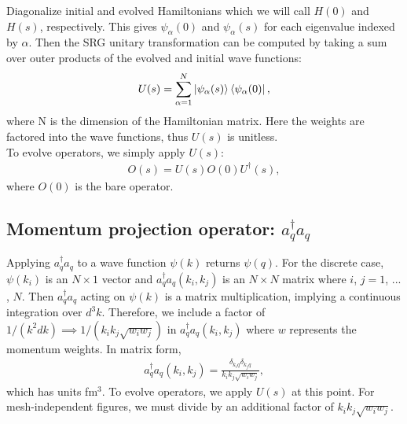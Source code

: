 \documentclass[preprintnumbers,floatfix,aps,prc,preprint,nofootinbib]{revtex4-1}
\begin{document}
Diagonalize initial and evolved Hamiltonians which we will call $H(0)$ and $H(s)$, respectively. This gives $\psi_{\alpha}(0)$ and $\psi_{\alpha}(s)$ for each eigenvalue indexed by $\alpha$. Then the SRG unitary transformation can be computed by taking a sum over outer products of the evolved and initial wave functions:
%
\begin{eqnarray}
	\label{eq:unitary_transformation}
	U(s) = \sum_{\alpha=1}^{N} \ket{\psi_{\alpha}(s)} \bra{\psi_{\alpha}(0)},
\end{eqnarray}
%
where N is the dimension of the Hamiltonian matrix. Here the weights are factored into the wave functions, thus $U(s)$ is unitless.
\\

To evolve operators, we simply apply $U(s)$:
%
\begin{eqnarray}
	\label{eq:evolved_operator}
	O(s) = U(s) O(0) U^{\dagger}(s),
\end{eqnarray}
%
where $O(0)$ is the bare operator.


\subsection{Momentum projection operator: $a^{\dagger}_q a_q$}
\label{sec:momentum_proj_operator}


Applying $a^{\dagger}_q a_q$ to a wave function $\psi(k)$ returns $\psi(q)$. For the discrete case, $\psi(k_i)$ is an $N \times 1$ vector and $a^{\dagger}_q a_q (k_i, k_j)$ is an $N \times N$ matrix where $i$, $j=1$, ... , $N$. Then $a^{\dagger}_q a_q$ acting on $\psi(k)$ is a matrix multiplication, implying a continuous integration over $d^3k$. Therefore, we include a factor of $1 / (k^2 dk) \implies 1 / (k_i k_j \sqrt{w_i w_j})$ in $a^{\dagger}_q a_q (k_i, k_j)$ where $w$ represents the momentum weights. In matrix form,
%
\begin{eqnarray}
	\label{eq:momentum_projection_operator}
	a^{\dagger}_q a_q (k_i, k_j) = \frac{\delta_{k_i q} \delta_{k_j q}}{k_i k_j \sqrt{w_i w_j}},
\end{eqnarray}
%
which has units fm$^3$. To evolve operators, we apply $U(s)$ at this point. For mesh-independent figures, we must divide by an additional factor of $k_i k_j \sqrt{w_i w_j}$.


\end{document}
